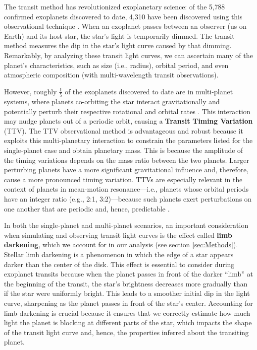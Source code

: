 \documentclass[linenumbers]{aastex631}
\begin{document}
The transit method has revolutionized exoplanetary science: of the 5,788 confirmed exoplanets discovered to date, 4,310 have been discovered using this observational technique \citep{exoplanetcandidates}. When an exoplanet passes between an observer (us on Earth) and its host star, the star's light is temporarily dimmed. The transit method measures the dip in the star’s light curve caused by that dimming. Remarkably, by analyzing these transit light curves, we can ascertain many of the planet’s characteristics, such as size (i.e., radius), orbital period, and even atmospheric composition (with multi-wavelength transit observations). \par \vspace{.1 cm}
However, roughly $\frac{1}{5}$ of the exoplanets discovered to date are in multi-planet systems, where planets co-orbiting the star interact gravitationally and potentially perturb their respective rotational and orbital rates \citep{exoplanetcandidates}. This interaction may nudge planets out of a periodic orbit, causing a \textbf{Transit Timing Variation} (TTV). The TTV observational method is advantageous and robust because it exploits this multi-planetary interaction to constrain the parameters listed for the single-planet case and obtain planetary mass. This is because the amplitude of the timing variations depends on the mass ratio between the two planets. Larger perturbing planets have a more significant gravitational influence and, therefore, cause a more pronounced timing variation. TTVs are especially relevant in the context of planets in mean-motion resonance—i.e., planets whose orbital periods have an integer ratio (e.g., 2:1, 3:2)—because such planets exert perturbations on one another that are periodic and, hence, predictable \citep{meanmotionresonance}. 
\par \vspace{.1 cm}
In both the single-planet and multi-planet scenarios, an important consideration when simulating and observing transit light curves is the effect called \textbf{limb darkening}, which we account for in our analysis (see section \ref{sec:Methods}). Stellar limb darkening is a phenomenon in which the edge of a star appears darker than the center of the disk. This effect is essential to consider during exoplanet transits because when the planet passes in front of the darker “limb” at the beginning of the transit, the star's brightness decreases more gradually than if the star were uniformly bright. This leads to a smoother initial dip in the light curve, sharpening as the planet passes in front of the star's center. Accounting for limb darkening is crucial because it ensures that we correctly estimate how much light the planet is blocking at different parts of the star, which impacts the shape of the transit light curve and, hence, the properties inferred about the transiting planet.
\end{document}
